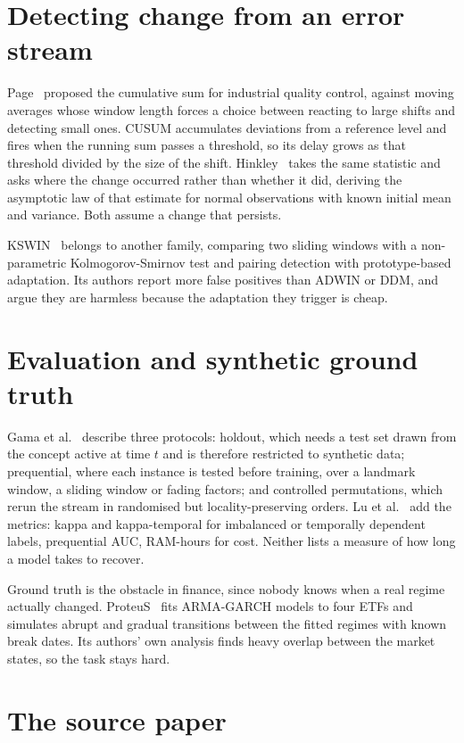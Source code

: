 \documentclass[10pt,a4paper]{article}
\begin{document}
\section{Detecting change from an error stream}

Page~\cite{page1954} proposed the cumulative sum for industrial quality control, against
moving averages whose window length forces a choice between reacting to large shifts and
detecting small ones. CUSUM accumulates deviations from a reference level and fires when the
running sum passes a threshold, so its delay grows as that threshold divided by the size of
the shift. Hinkley~\cite{hinkley1971} takes the same statistic and asks where the change
occurred rather than whether it did, deriving the asymptotic law of that estimate for normal
observations with known initial mean and variance. Both assume a change that persists.

KSWIN~\cite{raab2020} belongs to another family, comparing two sliding windows with a
non-parametric Kolmogorov-Smirnov test and pairing detection with prototype-based
adaptation. Its authors report more false positives than ADWIN or DDM, and argue they are
harmless because the adaptation they trigger is cheap.

\section{Evaluation and synthetic ground truth}

Gama et al.~\cite{gama2014} describe three protocols: holdout, which needs a test set drawn
from the concept active at time $t$ and is therefore restricted to synthetic data;
prequential, where each instance is tested before training, over a landmark window, a
sliding window or fading factors; and controlled permutations, which rerun the stream in
randomised but locality-preserving orders. Lu et al.~\cite{lu2018} add the metrics: kappa
and kappa-temporal for imbalanced or temporally dependent labels, prequential AUC,
RAM-hours for cost. Neither lists a measure of how long a model takes to recover.

Ground truth is the obstacle in finance, since nobody knows when a real regime actually
changed. ProteuS~\cite{suarez2025} fits ARMA-GARCH models to four ETFs and simulates abrupt
and gradual transitions between the fitted regimes with known break dates. Its authors' own
analysis finds heavy overlap between the market states, so the task stays hard.

\section{The source paper}
\end{document}
